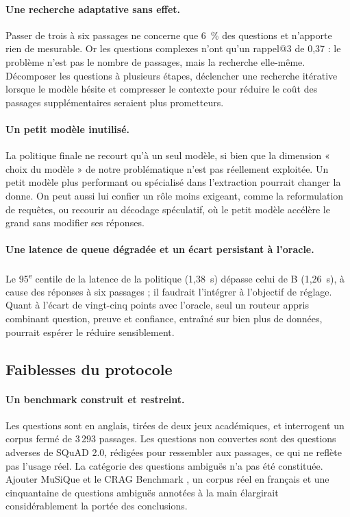 \documentclass[11pt,a4paper]{article}
\begin{document}
\paragraph{Une recherche adaptative sans effet.} Passer de trois à six passages ne concerne que 6~\% des
questions et n'apporte rien de mesurable. Or les questions complexes n'ont qu'un rappel@3 de 0,37 : le
problème n'est pas le nombre de passages, mais la recherche elle-même. Décomposer les questions à
plusieurs étapes, déclencher une recherche itérative lorsque le modèle hésite
\citep{jiang2023flare,su2024dragin} et compresser le contexte pour réduire le coût des passages
supplémentaires \citep{arefeen2024leancontext} seraient plus prometteurs.

\paragraph{Un petit modèle inutilisé.} La politique finale ne recourt qu'à un seul modèle, si bien que
la dimension « choix du modèle » de notre problématique n'est pas réellement exploitée. Un petit modèle
plus performant ou spécialisé dans l'extraction pourrait changer la donne. On peut aussi lui confier un
rôle moins exigeant, comme la reformulation de requêtes, ou recourir au décodage spéculatif, où le petit
modèle accélère le grand sans modifier ses réponses.

\paragraph{Une latence de queue dégradée et un écart persistant à l'oracle.} Le 95\textsuperscript{e}
centile de la latence de la politique (1,38~s) dépasse celui de B (1,26~s), à cause des réponses à six
passages ; il faudrait l'intégrer à l'objectif de réglage. Quant à l'écart de vingt-cinq points avec
l'oracle, seul un routeur appris combinant question, preuve et confiance, entraîné sur bien plus de
données, pourrait espérer le réduire sensiblement.

\subsection{Faiblesses du protocole}

\paragraph{Un benchmark construit et restreint.} Les questions sont en anglais, tirées de deux jeux
académiques, et interrogent un corpus fermé de 3\,293 passages. Les questions non couvertes sont des
questions adverses de SQuAD 2.0, rédigées pour ressembler aux passages, ce qui ne reflète pas l'usage
réel. La catégorie des questions ambiguës n'a pas été constituée. Ajouter MuSiQue
\citep{trivedi2022musique} et le CRAG Benchmark \citep{yang2024cragbench}, un corpus réel en français et
une cinquantaine de questions ambiguës annotées à la main élargirait considérablement la portée des
conclusions.
\end{document}
